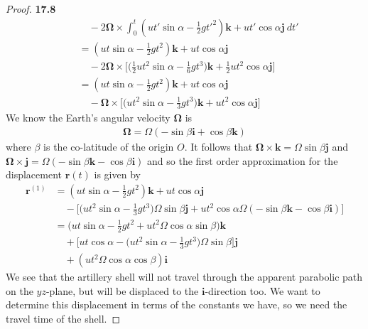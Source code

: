 \documentclass[11pt]{article}
\theoremstyle{definition}
\begin{document}
\begin{proof}{\textbf{17.8}}
\begin{align*}
        &\quad- 2\bm{\Omega}\times \int_0^t
        (ut'\sin\alpha - \frac{1}{2}gt'^2)\bm{k} + ut'\cos\alpha \bm{j}~dt'\\
        &= (ut\sin\alpha - \frac{1}{2}gt^2)\bm{k} + ut\cos\alpha \bm{j}\\
        &\quad- 2\bm{\Omega}\times
        \bigg[\bigg(\frac{1}{2}ut^2\sin\alpha - \frac{1}{6}gt^3\bigg)\bm{k}
        + \frac{1}{2}ut^2\cos\alpha \bm{j}\bigg]\\
        &= (ut\sin\alpha - \frac{1}{2}gt^2)\bm{k} + ut\cos\alpha \bm{j}\\
        &\quad- \bm{\Omega}\times
        \bigg[\bigg(ut^2\sin\alpha - \frac{1}{3}gt^3\bigg)\bm{k}
        + ut^2\cos\alpha \bm{j}\bigg]
    \end{align*}
    We know the Earth's angular velocity $\bm{\Omega}$ is
    \begin{align*}
        \bm{\Omega} = \Omega(-\sin\beta\bm{i} + \cos\beta \bm{k})
    \end{align*}
    where $\beta$ is the co-latitude of the origin $O$.
    It follows that $\bm{\Omega}\times\bm{k} = \Omega\sin\beta \bm{j}$
    and $\bm{\Omega}\times\bm{j} = \Omega(-\sin\beta\bm{k} - \cos\beta \bm{i})$
    and so the ﬁrst order approximation for the displacement $\bm{r}(t)$
    is given by
    \begin{align*}
        \bm r^{(1)}
        &= (ut\sin\alpha - \frac{1}{2}gt^2)\bm{k} + ut\cos\alpha \bm{j}\\
        &\quad-\bigg[
            \bigg(ut^2\sin\alpha - \frac{1}{3}gt^3\bigg)\Omega\sin\beta\bm{j}
            + ut^2\cos\alpha \Omega(-\sin\beta\bm{k} - \cos\beta \bm{i})
        \bigg]\\
        &= \bigg(
            ut\sin\alpha - \frac{1}{2}gt^2
            + ut^2\Omega\cos\alpha\sin\beta
        \bigg)\bm{k}\\
        &\quad + \bigg[ut\cos\alpha - \bigg(
            ut^2\sin\alpha - \frac{1}{3}gt^3
        \bigg)\Omega\sin\beta\bigg] \bm{j}\\
        &\quad + (ut^2\Omega\cos\alpha \cos\beta)\bm{i}
    \end{align*}
    We see that the artillery shell will not travel through the apparent
    parabolic path on the $yz$-plane, but will be displaced to the
    $\bm{i}$-direction too.
    We want to determine this displacement in terms of the constants we have,
    so we need the travel time of the shell.


\end{proof}
\end{document}
